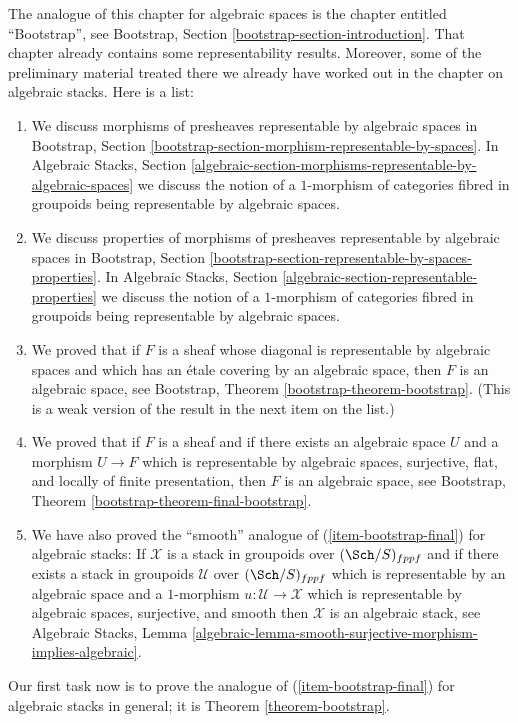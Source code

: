 \noindent
The analogue of this chapter for algebraic spaces is the chapter entitled
``Bootstrap'', see
Bootstrap, Section \ref{bootstrap-section-introduction}.
That chapter already contains some representability results.
Moreover, some of the preliminary material treated there we already
have worked out in the chapter on algebraic stacks.
Here is a list:
\begin{enumerate}
\item We discuss morphisms of presheaves representable by algebraic spaces in
Bootstrap, Section
\ref{bootstrap-section-morphism-representable-by-spaces}.
In
Algebraic Stacks, Section
\ref{algebraic-section-morphisms-representable-by-algebraic-spaces}
we discuss the notion of a $1$-morphism of categories fibred in groupoids
being representable by algebraic spaces.
\item We discuss properties of morphisms of presheaves representable by
algebraic spaces in
Bootstrap, Section
\ref{bootstrap-section-representable-by-spaces-properties}.
In
Algebraic Stacks, Section
\ref{algebraic-section-representable-properties}
we discuss the notion of a $1$-morphism of categories fibred in groupoids
being representable by algebraic spaces.
\item We proved that if $F$ is a sheaf whose diagonal is representable
by algebraic spaces and which has an \'etale covering by an algebraic
space, then $F$ is an algebraic space, see
Bootstrap, Theorem \ref{bootstrap-theorem-bootstrap}.
(This is a weak version of the result in the next item on the list.)
\item
\label{item-bootstrap-final}
We proved that if $F$ is a sheaf and if there exists an algebraic
space $U$ and a morphism $U \to F$ which is representable by algebraic
spaces, surjective, flat, and locally of finite presentation, then
$F$ is an algebraic space, see
Bootstrap, Theorem \ref{bootstrap-theorem-final-bootstrap}.
\item We have also proved the ``smooth'' analogue of
(\ref{item-bootstrap-final}) for algebraic
stacks: If $\mathcal{X}$ is a stack in groupoids over
$(\Sch/S)_{fppf}$ and if there exists a stack in groupoids
$\mathcal{U}$ over $(\Sch/S)_{fppf}$ which is representable
by an algebraic space and a $1$-morphism $u : \mathcal{U} \to \mathcal{X}$
which is representable by algebraic spaces, surjective, and smooth
then $\mathcal{X}$ is an algebraic stack, see
Algebraic Stacks, Lemma
\ref{algebraic-lemma-smooth-surjective-morphism-implies-algebraic}.
\end{enumerate}
Our first task now is to prove the analogue of
(\ref{item-bootstrap-final}) for algebraic
stacks in general; it is
Theorem \ref{theorem-bootstrap}.



